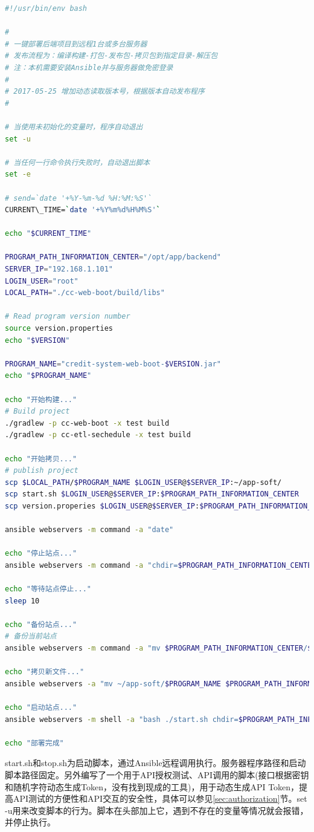 \documentclass[12pt]{book}
\numberwithin{dummy}{section}
\theoremstyle{ocrenumbox}
\theoremstyle{blacknumex}
\theoremstyle{blacknumbox}
\theoremstyle{ocrenum}
\begin{document}
\begin{lstlisting}[language=Bash]
#!/usr/bin/env bash

#
# 一键部署后端项目到远程1台或多台服务器
# 发布流程为：编译构建-打包-发布包-拷贝包到指定目录-解压包
# 注：本机需要安装Ansible并与服务器做免密登录
#
# 2017-05-25 增加动态读取版本号，根据版本自动发布程序
#

# 当使用未初始化的变量时，程序自动退出
set -u

# 当任何一行命令执行失败时，自动退出脚本
set -e

# send=`date '+%Y-%m-%d %H:%M:%S'`
CURRENT\_TIME=`date '+%Y%m%d%H%M%S'`

echo "$CURRENT_TIME"

PROGRAM_PATH_INFORMATION_CENTER="/opt/app/backend"
SERVER_IP="192.168.1.101"
LOGIN_USER="root"
LOCAL_PATH="./cc-web-boot/build/libs"

# Read program version number
source version.properties
echo "$VERSION"

PROGRAM_NAME="credit-system-web-boot-$VERSION.jar"
echo "$PROGRAM_NAME"

echo "开始构建..."
# Build project
./gradlew -p cc-web-boot -x test build
./gradlew -p cc-etl-sechedule -x test build

echo "开始拷贝..."
# publish project
scp $LOCAL_PATH/$PROGRAM_NAME $LOGIN_USER@$SERVER_IP:~/app-soft/
scp start.sh $LOGIN_USER@$SERVER_IP:$PROGRAM_PATH_INFORMATION_CENTER
scp version.properies $LOGIN_USER@$SERVER_IP:$PROGRAM_PATH_INFORMATION_CENTER

ansible webservers -m command -a "date"

echo "停止站点..."
ansible webservers -m command -a "chdir=$PROGRAM_PATH_INFORMATION_CENTER bash ./stop.sh"

echo "等待站点停止..."
sleep 10

echo "备份站点..."
# 备份当前站点
ansible webservers -m command -a "mv $PROGRAM_PATH_INFORMATION_CENTER/$PROGRAM_NAME $PROGRAM_PATH_INFORMATION_CENTER/$PROGRAM_NAME-$CURRENT_TIME"

echo "拷贝新文件..."
ansible webservers -a "mv ~/app-soft/$PROGRAM_NAME $PROGRAM_PATH_INFORMATION_CENTER"

echo "启动站点..."
ansible webservers -m shell -a "bash ./start.sh chdir=$PROGRAM_PATH_INFORMATION_CENTER"

echo "部署完成"
\end{lstlisting}

start.sh和stop.sh为启动脚本，通过Ansible远程调用执行。服务器程序路径和启动脚本路径固定。另外编写了一个用于API授权测试、API调用的脚本(接口根据密钥和随机字符动态生成Token，没有找到现成的工具)，用于动态生成API Token，提高API测试的方便性和API交互的安全性，具体可以参见\ref{sec:authorization}节。set -u用来改变脚本的行为。脚本在头部加上它，遇到不存在的变量等情况就会报错，并停止执行。
\end{document}
